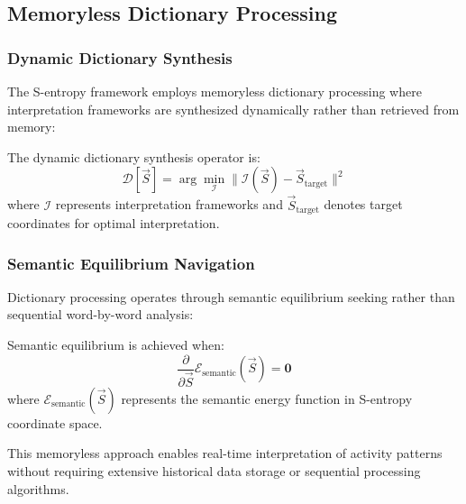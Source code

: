 \subsection{Memoryless Dictionary Processing}

\subsubsection{Dynamic Dictionary Synthesis}

The S-entropy framework employs memoryless dictionary processing where interpretation frameworks are synthesized dynamically rather than retrieved from memory:

\begin{definition}
The dynamic dictionary synthesis operator is:
\begin{equation}
\mathcal{D}[\vec{S}] = \arg\min_{\mathcal{I}} \|\mathcal{I}(\vec{S}) - \vec{S}_{\text{target}}\|^2
\end{equation}
where $\mathcal{I}$ represents interpretation frameworks and $\vec{S}_{\text{target}}$ denotes target coordinates for optimal interpretation.
\end{definition}

\subsubsection{Semantic Equilibrium Navigation}

Dictionary processing operates through semantic equilibrium seeking rather than sequential word-by-word analysis:

\begin{definition}
Semantic equilibrium is achieved when:
\begin{equation}
\frac{\partial}{\partial \vec{S}} \mathcal{E}_{\text{semantic}}(\vec{S}) = \mathbf{0}
\end{equation}
where $\mathcal{E}_{\text{semantic}}(\vec{S})$ represents the semantic energy function in S-entropy coordinate space.
\end{definition}

This memoryless approach enables real-time interpretation of activity patterns without requiring extensive historical data storage or sequential processing algorithms.
